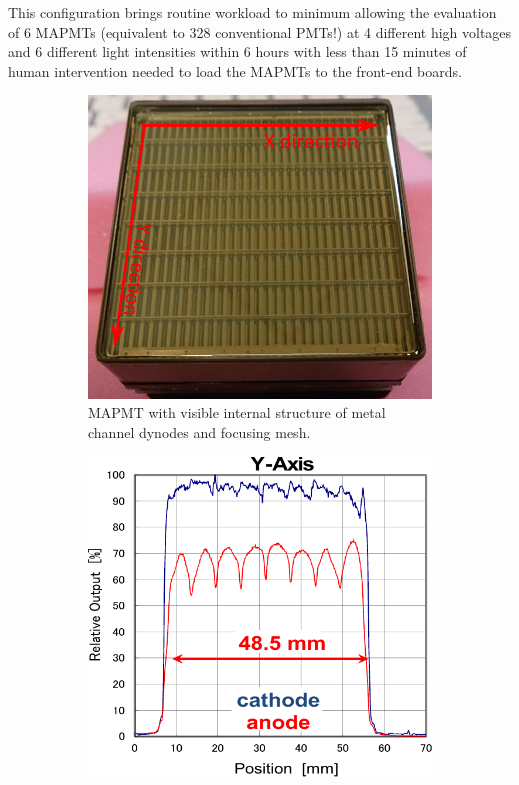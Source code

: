 This configuration brings routine workload to minimum allowing the evaluation of 6 MAPMTs (equivalent to 328 conventional PMTs!) at 4 different high voltages and 6 different light intensities within 6 hours with less than 15 minutes of human intervention needed to load the MAPMTs to the front-end boards.

\begin{figure}[b]
	\centering
	\begin{subfigure}{0.3\linewidth}
		\includegraphics[width=\textwidth]{figures/surfaceuniform1.pdf}
		\caption{MAPMT with visible internal structure of metal channel dynodes and focusing mesh.}
		\label{fig:surfaceuniform1}
	\end{subfigure}
	\quad
	\begin{subfigure}{0.3\linewidth}
		\includegraphics[width=\textwidth]{figures/surfaceuniform3.pdf}

\end{subfigure}
\end{figure}
